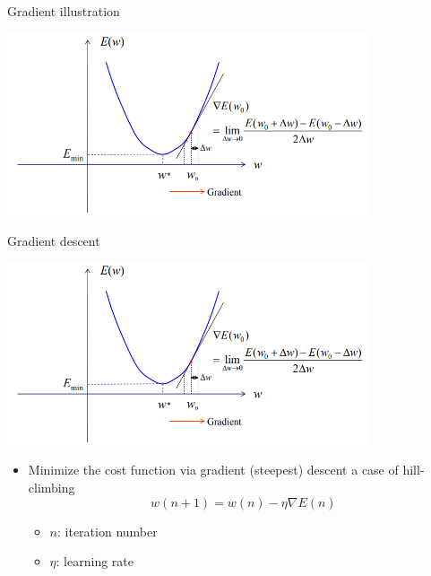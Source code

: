 \documentclass[notes]{beamer}
\providecommand{\tightlist}{%
  \setlength{\itemsep}{0pt}\setlength{\parskip}{0pt}}
\begin{document}
\begin{frame}{Gradient illustration}

\centering 

\includegraphics[width=0.80000\textwidth]{2018-03-10-09-23-28.png}\\

\end{frame}

\begin{frame}{Gradient descent}

\centering 

\includegraphics[width=0.80000\textwidth]{2018-03-10-09-23-28.png}\\

\begin{itemize}
\item
  Minimize the cost function via gradient (steepest) descent a case of
  hill-climbing \[w( n + 1) = w( n ) − \eta \nabla E ( n )\]

  \begin{itemize}
  \tightlist
  \item
    \(n\): iteration number
  \item
    \(\eta\): learning rate
  \end{itemize}
\end{itemize}

\end{frame}
\end{document}
